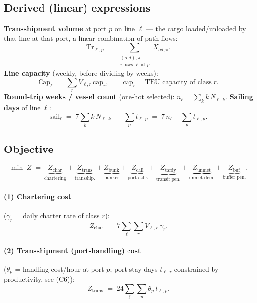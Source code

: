 \documentclass[11pt]{article}
\newcommand{\Tr}{\mathrm{Tr}}
\newcommand{\Cap}{\mathrm{Cap}}
\newcommand{\sail}{\mathrm{sail}}
\begin{document}
\subsection{Derived (linear) expressions}
\textbf{Transshipment volume} at port $p$ on line $\ell$ --- the cargo loaded/unloaded
by that line at that port, a linear combination of path flows:
\begin{equation}
  \Tr_{\ell,p} \;=\; \sum_{\substack{(o,d),\pi \\ \pi \text{ uses } \ell \text{ at } p}} X_{od,\pi}.
\end{equation}
\textbf{Line capacity} (weekly, before dividing by weeks):
\begin{equation}
  \Cap_\ell \;=\; \sum_{r} V_{\ell,r}\, \mathrm{cap}_r,
  \qquad \mathrm{cap}_r=\text{TEU capacity of class }r .
\end{equation}
\textbf{Round-trip weeks / vessel count} (one-hot selected): $n_\ell = \sum_k k\,N_{\ell,k}$.
\textbf{Sailing days} of line $\ell$:
\begin{equation}
  \sail_\ell \;=\; 7\sum_k k\,N_{\ell,k} \;-\; \sum_p t_{\ell,p}
  \;=\; 7\,n_\ell - \sum_p t_{\ell,p} .
\end{equation}

\subsection{Objective}
\begin{equation}
\min \; Z \;=\; \underbrace{Z_{\text{char}}}_{\text{chartering}}
+ \underbrace{Z_{\text{trans}}}_{\text{transship.}}
+ \underbrace{Z_{\text{bunk}}}_{\text{bunker}}
+ \underbrace{Z_{\text{call}}}_{\text{port calls}}
+ \underbrace{Z_{\text{tardy}}}_{\text{transit pen.}}
+ \underbrace{Z_{\text{unmet}}}_{\text{unmet dem.}}
+ \underbrace{Z_{\text{buf}}}_{\text{buffer pen.}} .
\end{equation}

\paragraph{(1) Chartering cost} ($\gamma_r$ = daily charter rate of class $r$):
\begin{equation}
  Z_{\text{char}} \;=\; 7\sum_{\ell}\sum_{r} V_{\ell,r}\,\gamma_r .
\end{equation}

\paragraph{(2) Transshipment (port-handling) cost} ($\theta_p$ = handling cost/hour at
port $p$; port-stay days $t_{\ell,p}$ constrained by productivity, see (C6)):
\begin{equation}
  Z_{\text{trans}} \;=\; 24\sum_{\ell}\sum_{p} \theta_p\, t_{\ell,p} .
\end{equation}
\end{document}
